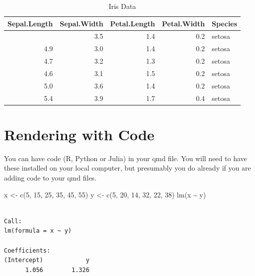 \documentclass[
  letterpaper,
  oneside,
  open=any]{scrbook}
\newenvironment{Shaded}{\begin{snugshade}}{\end{snugshade}}
\newcommand{\DecValTok}[1]{\textcolor[rgb]{0.68,0.00,0.00}{#1}}
\newcommand{\FunctionTok}[1]{\textcolor[rgb]{0.28,0.35,0.67}{#1}}
\newcommand{\NormalTok}[1]{\textcolor[rgb]{0.00,0.23,0.31}{#1}}
\newcommand{\OtherTok}[1]{\textcolor[rgb]{0.00,0.23,0.31}{#1}}
\newcommand{\SpecialCharTok}[1]{\textcolor[rgb]{0.37,0.37,0.37}{#1}}
\begin{document}
\begin{longtable}[]{@{}rrrrl@{}}

\caption{\label{tbl-iris}Iris Data}

\tabularnewline

\toprule\noalign{}
Sepal.Length & Sepal.Width & Petal.Length & Petal.Width & Species \\
\midrule\noalign{}
\endhead
\bottomrule\noalign{}
\endlastfoot
5.1 & 3.5 & 1.4 & 0.2 & setosa \\
4.9 & 3.0 & 1.4 & 0.2 & setosa \\
4.7 & 3.2 & 1.3 & 0.2 & setosa \\
4.6 & 3.1 & 1.5 & 0.2 & setosa \\
5.0 & 3.6 & 1.4 & 0.2 & setosa \\
5.4 & 3.9 & 1.7 & 0.4 & setosa \\

\end{longtable}


\chapter{Rendering with Code}\label{rendering-with-code}

You can have code (R, Python or Julia) in your qmd file. You will need
to have these installed on your local computer, but presumably you do
already if you are adding code to your qmd files.

\begin{Shaded}
\begin{Highlighting}[]
\NormalTok{x }\OtherTok{\textless{}{-}} \FunctionTok{c}\NormalTok{(}\DecValTok{5}\NormalTok{, }\DecValTok{15}\NormalTok{, }\DecValTok{25}\NormalTok{, }\DecValTok{35}\NormalTok{, }\DecValTok{45}\NormalTok{, }\DecValTok{55}\NormalTok{)}
\NormalTok{y }\OtherTok{\textless{}{-}} \FunctionTok{c}\NormalTok{(}\DecValTok{5}\NormalTok{, }\DecValTok{20}\NormalTok{, }\DecValTok{14}\NormalTok{, }\DecValTok{32}\NormalTok{, }\DecValTok{22}\NormalTok{, }\DecValTok{38}\NormalTok{)}
\FunctionTok{lm}\NormalTok{(x }\SpecialCharTok{\textasciitilde{}}\NormalTok{ y)}
\end{Highlighting}
\end{Shaded}

\begin{verbatim}

Call:
lm(formula = x ~ y)

Coefficients:
(Intercept)            y  
      1.056        1.326  
\end{verbatim}
\end{document}
